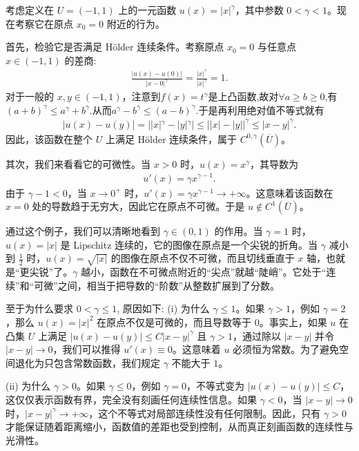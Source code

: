 \documentclass[../../main.tex]{subfiles}
\begin{document}
\begin{examples}\label{examples:例在gamma上的例子}
考虑定义在 $U = (-1, 1)$ 上的一元函数 $u(x) = |x|^{\gamma}$，其中参数 $0 < \gamma < 1$。现在考察它在原点 $x_0 = 0$ 附近的行为。

首先，检验它是否满足 H\"older 连续条件。考察原点 $x_0 = 0$ 与任意点 $x \in (-1, 1)$ 的差商:
\begin{align*}
\frac{|u(x) - u(0)|}{|x - 0|^{\gamma}} = \frac{|x|^{\gamma}}{|x|^{\gamma}} = 1.
\end{align*}
对于一般的 $x, y \in (-1, 1)$，注意到$f(x)=t^{\gamma}$是上凸函数,故对$\forall a\geqslant b\geqslant 0$,有$(a+b)^{\gamma}\leqslant a^\gamma+b^\gamma$.从而$a^\gamma -b^\gamma \leqslant (a-b)^\gamma$.于是再利用绝对值不等式就有
\begin{align}\label{eq::jiojsjiofjiodfijosdfijosdfijossjdkosfj}
|u(x)-u(y)|=||x|^{\gamma}-|y|^{\gamma}|\leqslant \left| |x|-|y| \right|^{\gamma}\leqslant |x-y|^{\gamma}.
\end{align}
因此，该函数在整个 $U$ 上满足 H\"older 连续条件，属于 $C^{0, \gamma}(\overline{U})$。

其次，我们来看看它的可微性。当 $x > 0$ 时，$u(x) = x^{\gamma}$，其导数为
\begin{align*}
u'(x) = \gamma x^{\gamma - 1}.
\end{align*}
由于 $\gamma - 1 < 0$，当 $x \to 0^+$ 时，$u'(x) = \gamma x^{\gamma - 1} \to +\infty$。这意味着该函数在 $x = 0$ 处的导数趋于无穷大，因此它在原点不可微。于是 $u \notin C^1(\overline{U})$。

通过这个例子，我们可以清晰地看到 $\gamma \in (0,1)$ 的作用。当 $\gamma = 1$ 时，$u(x) = |x|$ 是 Lipschitz 连续的，它的图像在原点是一个尖锐的折角。当 $\gamma$ 减小到 $\frac{1}{2}$ 时，$u(x) = \sqrt{|x|}$ 的图像在原点不仅不可微，而且切线垂直于 $x$ 轴，也就是“更尖锐”了。$\gamma$ 越小，函数在不可微点附近的“尖点”就越“陡峭”。它处于“连续”和“可微”之间，相当于把导数的“阶数”从整数扩展到了分数。
\end{examples}
\begin{remark}
至于为什么要求 $0<\gamma\leqslant 1$, 原因如下:
(i) 为什么 $\gamma \leqslant 1$。如果 $\gamma > 1$，例如 $\gamma = 2$，那么 $u(x) = |x|^2$ 在原点不仅是可微的，而且导数等于 $0$。事实上，如果 $u$ 在凸集 $U$ 上满足 $|u(x) - u(y)| \leqslant C|x - y|^{\gamma}$ 且 $\gamma > 1$，通过除以 $|x - y|$ 并令 $|x - y| \to 0$，我们可以推得 $u'(x) \equiv 0$。这意味着 $u$ 必须恒为常数。为了避免空间退化为只包含常数函数，我们规定 $\gamma$ 不能大于 $1$。

(ii) 为什么 $\gamma > 0$。如果 $\gamma \leqslant 0$，例如 $\gamma = 0$，不等式变为 $|u(x) - u(y)| \leqslant C$，这仅仅表示函数有界，完全没有刻画任何连续性信息。如果 $\gamma < 0$，当 $|x - y| \to 0$ 时，$|x - y|^{\gamma} \to +\infty$，这个不等式对局部连续性没有任何限制。因此，只有 $\gamma > 0$ 才能保证随着距离缩小，函数值的差距也受到控制，从而真正刻画函数的连续性与光滑性。
\end{remark}
\end{document}
